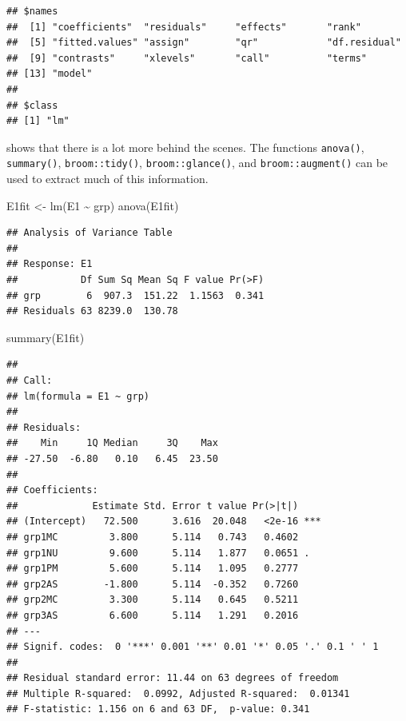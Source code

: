 \documentclass[
]{book}
\newenvironment{Shaded}{\begin{snugshade}}{\end{snugshade}}
\newcommand{\FunctionTok}[1]{\textcolor[rgb]{0.00,0.00,0.00}{#1}}
\newcommand{\NormalTok}[1]{#1}
\newcommand{\OtherTok}[1]{\textcolor[rgb]{0.56,0.35,0.01}{#1}}
\newcommand{\SpecialCharTok}[1]{\textcolor[rgb]{0.00,0.00,0.00}{#1}}
\begin{document}
\begin{verbatim}
## $names
##  [1] "coefficients"  "residuals"     "effects"       "rank"         
##  [5] "fitted.values" "assign"        "qr"            "df.residual"  
##  [9] "contrasts"     "xlevels"       "call"          "terms"        
## [13] "model"        
## 
## $class
## [1] "lm"
\end{verbatim}

shows that there is a lot more behind the scenes. The functions \texttt{anova()}, \texttt{summary()}, \texttt{broom::tidy()}, \texttt{broom::glance()}, and \texttt{broom::augment()} can be used to extract much of this information.

\begin{Shaded}
\begin{Highlighting}[]
\NormalTok{E1fit }\OtherTok{\textless{}{-}} \FunctionTok{lm}\NormalTok{(E1 }\SpecialCharTok{\textasciitilde{}}\NormalTok{ grp)}
\FunctionTok{anova}\NormalTok{(E1fit)}
\end{Highlighting}
\end{Shaded}

\begin{verbatim}
## Analysis of Variance Table
## 
## Response: E1
##           Df Sum Sq Mean Sq F value Pr(>F)
## grp        6  907.3  151.22  1.1563  0.341
## Residuals 63 8239.0  130.78
\end{verbatim}

\begin{Shaded}
\begin{Highlighting}[]
\FunctionTok{summary}\NormalTok{(E1fit)}
\end{Highlighting}
\end{Shaded}

\begin{verbatim}
## 
## Call:
## lm(formula = E1 ~ grp)
## 
## Residuals:
##    Min     1Q Median     3Q    Max 
## -27.50  -6.80   0.10   6.45  23.50 
## 
## Coefficients:
##             Estimate Std. Error t value Pr(>|t|)    
## (Intercept)   72.500      3.616  20.048   <2e-16 ***
## grp1MC         3.800      5.114   0.743   0.4602    
## grp1NU         9.600      5.114   1.877   0.0651 .  
## grp1PM         5.600      5.114   1.095   0.2777    
## grp2AS        -1.800      5.114  -0.352   0.7260    
## grp2MC         3.300      5.114   0.645   0.5211    
## grp3AS         6.600      5.114   1.291   0.2016    
## ---
## Signif. codes:  0 '***' 0.001 '**' 0.01 '*' 0.05 '.' 0.1 ' ' 1
## 
## Residual standard error: 11.44 on 63 degrees of freedom
## Multiple R-squared:  0.0992, Adjusted R-squared:  0.01341 
## F-statistic: 1.156 on 6 and 63 DF,  p-value: 0.341
\end{verbatim}
\end{document}
